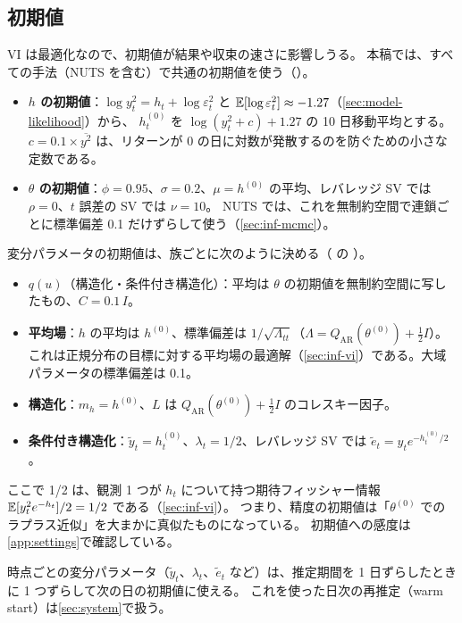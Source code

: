 \begin{table}[tbp]
  \centering
  \caption{変分族の比較（基本 SV、$T = 1{,}000$）。
    (R1)〜(R4) は\cref{sec:fam-requirements}の要件で、○は満たす、△は一部のみ、×は満たさない。
    (R1) は $h_t$ の時間方向の相関、(R2) は $\theta$ と $h$ の依存（フルランクは正規分布で表せる線形の依存のみ、低ランクは少数の因子を通じた依存のみ）、
    (R3) の計算量は 1 サンプルあたりのサンプリングと密度計算の計算量、パラメータ数は実際に最適化される変分パラメータの数（下三角行列は $k(k+1)/2$ 個と数える）、
    (R4) の不変性は中心化と非中心化で $(\theta, h)$ の分布の族が変わらないこと。}
  \label{tab:families}
  \footnotesize
  \setlength{\tabcolsep}{4pt}
  
\end{table}

\subsection{初期値}\label{sec:fam-init}

VI は最適化なので、初期値が結果や収束の速さに影響しうる。
本稿では、すべての手法（NUTS を含む）で共通の初期値を使う（）。
\begin{itemize}
  \item \textbf{$h$ の初期値}：$\log y_t^2 = h_t + \log\varepsilon_t^2$ と $\mathbb{E}[\log\varepsilon_t^2] \approx -1.27$（\cref{sec:model-likelihood}）から、
    $h^{(0)}_t$ を $\log(y_t^2 + c) + 1.27$ の 10 日移動平均とする。$c = 0.1 \times \overline{y^2}$ は、リターンが 0 の日に対数が発散するのを防ぐための小さな定数である。
  \item \textbf{$\theta$ の初期値}：$\phi = 0.95$、$\sigma = 0.2$、$\mu = h^{(0)}$ の平均、レバレッジ SV では $\rho = 0$、$t$ 誤差の SV では $\nu = 10$。
    NUTS では、これを無制約空間で連鎖ごとに標準偏差 0.1 だけずらして使う（\cref{sec:inf-mcmc}）。
\end{itemize}
変分パラメータの初期値は、族ごとに次のように決める（ の ）。
\begin{itemize}
  \item \textbf{$q(u)$}（構造化・条件付き構造化）：平均は $\theta$ の初期値を無制約空間に写したもの、$C = 0.1\, I$。
  \item \textbf{平均場}：$h$ の平均は $h^{(0)}$、標準偏差は $1/\sqrt{\Lambda_{tt}}$（$\Lambda = Q_{\mathrm{AR}}(\theta^{(0)}) + \frac{1}{2}I$）。これは正規分布の目標に対する平均場の最適解（\cref{sec:inf-vi}）である。大域パラメータの標準偏差は 0.1。
  \item \textbf{構造化}：$m_h = h^{(0)}$、$L$ は $Q_{\mathrm{AR}}(\theta^{(0)}) + \frac{1}{2}I$ のコレスキー因子。
  \item \textbf{条件付き構造化}：$\tilde y_t = h^{(0)}_t$、$\lambda_t = 1/2$、レバレッジ SV では $\tilde e_t = y_t e^{-h^{(0)}_t/2}$。
\end{itemize}
ここで 1/2 は、観測 1 つが $h_t$ について持つ期待フィッシャー情報 $\mathbb{E}[y_t^2 e^{-h_t}]/2 = 1/2$ である（\cref{sec:inf-vi}）。
つまり、精度の初期値は「$\theta^{(0)}$ でのラプラス近似」を大まかに真似たものになっている。
初期値への感度は\cref{app:settings}で確認している。

時点ごとの変分パラメータ（$\tilde y_t$、$\lambda_t$、$\tilde e_t$ など）は、推定期間を 1 日ずらしたときに 1 つずらして次の日の初期値に使える。
これを使った日次の再推定（warm start）は\cref{sec:system}で扱う。
